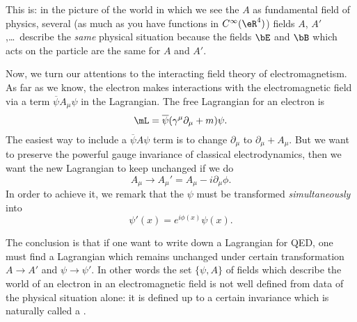 This is: in the picture of the world in which we see the $A$ as fundamental field of physics, several (as much as you have functions in $C^{\infty}(\eR^4)$) fields $A$, $A'$,\ldots\ describe the \emph{same} physical situation because the fields $\bE$ and $\bB$ which acts on the particle are the same for $A$ and $A'$.

Now, we turn our attentions to the interacting field theory of electromagnetism. As far as we know, the electron makes interactions with the electromagnetic field via a term $\overline{ \psi } A_{\mu}\psi$ in the Lagrangian. The free Lagrangian for an electron is
%
%
\begin{equation}\label{eq:freeL}
\mL=\overline{ \psi }(\gamma^{\mu}\partial_{\mu}+m)\psi.
\end{equation}
%
 The easiest way to include a $\overline{ \psi } A\psi$ term is to change $\partial_{\mu}$ to $\partial_{\mu}+A_{\mu}$. But we want to preserve the powerful gauge invariance of classical electrodynamics, then we want the new Lagrangian to keep unchanged if we do
 \begin{equation} \label{eq_jaugeA_em}
 A_{\mu}\rightarrow A_{\mu}'=A_{\mu}-i\partial_{\mu}\phi.
 \end{equation}
  In order to achieve it, we remark that the $\psi$ must be transformed \textit{simultaneously} into
\begin{equation}\label{eq:jaugepsi_em}
 \psi'(x)=e^{i\phi(x)}\psi(x).
\end{equation}

The conclusion is that if one want to write down a Lagrangian for QED, one must find a Lagrangian which remains unchanged under certain transformation $A\rightarrow A'$ and $\psi\rightarrow\psi'$. In other words the set $\{\psi,A\}$ of fields which describe the world of an electron in an electromagnetic field is not well defined from data of the physical situation alone: it is defined up to a certain invariance which is naturally called a .

